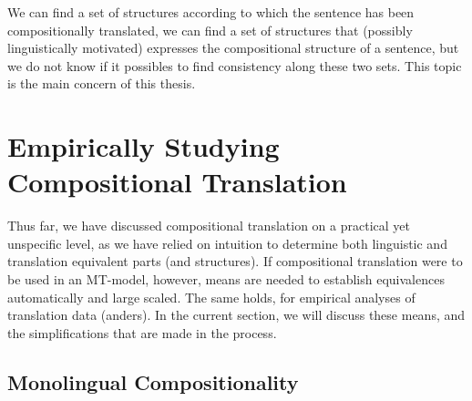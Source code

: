\documentclass{report}
\theoremstyle{definition}
\theoremstyle{plain}
\begin{document}
We can find a set of structures according to which the sentence has been compositionally translated, we can find a set of structures that (possibly linguistically motivated) expresses the compositional structure of a sentence, but we do not know if it possibles to find consistency along these two sets. This topic is the main concern of this thesis.



\section{Empirically Studying Compositional Translation}

Thus far, we have discussed compositional translation on a practical yet unspecific level, as we have relied on intuition to determine both linguistic and translation equivalent parts (and structures). If compositional translation were to be used in an MT-model, however, means are needed to establish equivalences automatically and large scaled. The same holds, for empirical analyses of translation data (anders). In the current section, we will discuss these means, and the simplifications that are made in the process.

\subsection{Monolingual Compositionality}
\label{sec:depgram}
\end{document}

